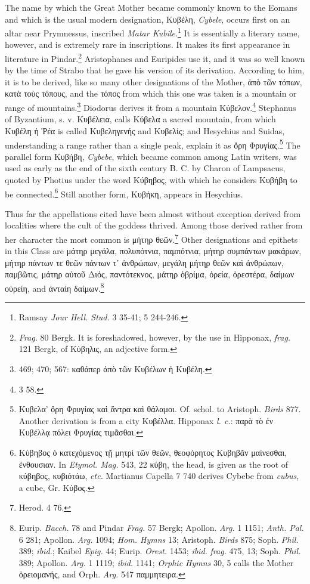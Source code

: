 \documentclass[a4paper, 11pt, oneside, polutonikogreek, english]{article}
\begin{document}
The name by which the Great Mother became commonly known to the Eomans and which is the usual modern designation, Κυβέλη, \emph{Cybele}, occurs first on an altar near Prymnessus, inscribed \emph{Matar Kubile}.\footnote{Ramsay \emph{Jour Hell. Stud.} 3 35-41; 5 244-246.} It is essentially a literary name, however, and is extremely rare in inscriptions. It makes its first appearance in literature in Pindar.\footnote{\emph{Frag.} 80 Bergk. It is foreshadowed, however, by the use in Hipponax, \emph{frag.} 121 Bergk, of Κὑβηλις, an adjective form.} Aristophanes and Euripides use it, and it was so well known by the time of Strabo that he gave his version of its derivation. According to him, it is to be derived, like so many other designations of the Mother, ἀπὸ τῶν τόπων, κατὰ τοὺς τόπους, and the τόπος from which this one was taken is a mountain or range of mountains.\footnote{469; 470; 567: καθάπερ ἀπὸ τῶν Κυβέλων ἡ Κυβέλη.} Diodorus derives it from a mountain Κύβελον.\footnote{3 58.} Stephanus of Byzantium, s. v. Κυβέλεια, calls Κύβελα a sacred mountain, from which Κυβέλη ἡ Ῥέα is called Κυβεληγενής and Κυβελίς; and Hesychius and Suidas, understanding a range rather than a single peak, explain it as ὄρη Φρυγίας.\footnote{Κυβελα' ὄρη Φρυγίας καὶ ἄντρα καὶ θάλαμοι. Of. schol. to Aristoph. \emph{Birds} 877. Another derivation is from a city Κυβέλλα. Hipponax \emph{l. c.}: παρὰ τὸ ἐν Κυβέλλᾳ πόλει Φρυγίας τιμᾶσθαι.} The parallel form Κυβήβη, \emph{Cybebe}, which became common among Latin writers, was used as early as the end of the sixth century B. C. by Charon of Lampsacus, quoted by Photius under the word Κύβηβος, with which he considers Κυβήβη to be connected.\footnote{Κύβηβος ὁ κατεχόμενος τῇ μητρὶ τῶν θεῶν, θεοφόρητος Κυβηβᾶν μαίνεσθαι, ἐνθουσιαν. In \emph{Etymol. Mag.} 543, 22 κύβη, the head, is given as the root of κύβηβος, κυβιότάω, \emph{etc.} Martianus Capella 7 740 derives Cybebe from \emph{cubus}, a cube, Gr. Κύβος.} Still another form, Κυβήκη, appears in Hesychius.

Thus far the appellations cited have been almost without exception derived from localities where the cult of the goddess thrived. Among those derived rather from her character the most common is μήτηρ θεῶν.\footnote{Herod. 4 76.} Other designations and epithets in this Class are μάτηρ μεγάλα, πολυπότνια, παμπότνια, μήτηρ συμπάντων μακάρων, μήτηρ πάντων τε θεῶν πάντων τ᾽ ἀνθρώπων, μεγάλη μήτηρ θεῶν καὶ ἀνθρώπων, παμβῶτις, μάτηρ αὐτοῦ Διός, παντότεκνος, μάτηρ ὀβρίμα, ὀρεία, ὀρεστέρα, δαίμων οὐρείη, and ἀνταίη δαίμων.\footnote{Eurip. \emph{Bacch.} 78 and Pindar \emph{Frag.} 57 Bergk; Apollon. \emph{Arg.} 1 1151; \emph{Anth. Pal.} 6 281; Apollon. \emph{Arg.} 1094; \emph{Hom. Hymns} 13; Aristoph. \emph{Birds} 875; Soph. \emph{Phil.} 389; \emph{ibid.}; Kaibel \emph{Epig.} 44; Eurip. \emph{Orest.} 1453; \emph{ibid.} \emph{frag.} 475, 13; Soph. \emph{Phil.} 389; Apollon. \emph{Arg.} 1 1119; \emph{ibid.} 1141; \emph{Orphic Hymns} 30, 5 calls the Mother ὀρειομανής, and Orph. \emph{Arg.} 547 παμμητειρα.}
\end{document}
